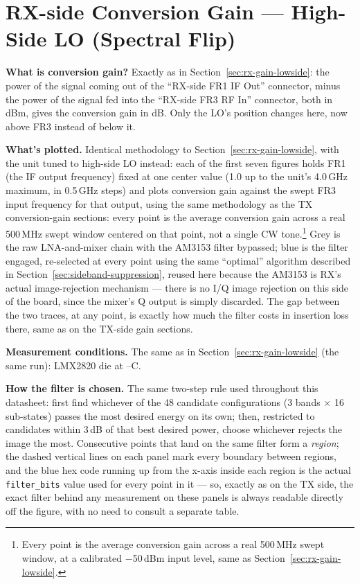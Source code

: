 \clearpage
\section{RX-side Conversion Gain --- High-Side LO (Spectral Flip)}
\label{sec:rx-gain-highside}

\textbf{What is conversion gain?} Exactly as in Section~\ref{sec:rx-gain-lowside}: the power of the signal
coming out of the ``RX-side FR1 IF Out'' connector, minus the power of the signal fed into the ``RX-side FR3 RF In'' connector, both in dBm,
gives the conversion gain in dB. Only the LO's position changes here, now above FR3 instead of below it.

\textbf{What's plotted.} Identical methodology to Section~\ref{sec:rx-gain-lowside}, with the unit tuned to
high-side LO instead: each of the first seven figures holds FR1 (the IF output frequency) fixed at one center
value (1.0 up to the unit's 4.0\,GHz maximum, in 0.5\,GHz steps) and plots conversion gain against the swept
FR3 input frequency for that output, using the same methodology as the TX conversion-gain sections: every point
is the average conversion gain across a real 500\,MHz swept window centered on that point, not a single CW
tone.\footnote{Every point is the average conversion gain across a real 500\,MHz swept window, at a calibrated
−50\,dBm input level, same as Section~\ref{sec:rx-gain-lowside}.} Grey is the raw LNA-and-mixer chain with
the AM3153 filter bypassed; blue is the filter engaged, re-selected at every point using the same ``optimal''
algorithm described in Section~\ref{sec:sideband-suppression}, reused here because the AM3153 is RX's actual
image-rejection mechanism --- there is no I/Q image rejection on this side of the board, since the mixer's Q
output is simply discarded. The gap between the two traces, at any point, is exactly how much the filter costs
in insertion loss there, same as on the TX-side gain sections.

\textbf{Measurement conditions.} The same as in Section~\ref{sec:rx-gain-lowside} (the same run): LMX2820 die at \condRxGainMinC--\condRxGainMaxC\textdegree C.

\textbf{How the filter is chosen.} The same two-step rule used throughout this datasheet: first find whichever
of the 48 candidate configurations (3 bands × 16 sub-states) passes the most desired energy on its own;
then, restricted to candidates within 3\,dB of that best desired power, choose whichever rejects the image the
most. Consecutive points that land on the same filter form a \emph{region}; the dashed vertical lines on each
panel mark every boundary between regions, and the blue hex code running up from the x-axis inside each region
is the actual \texttt{filter\_bits} value used for every point in it --- so, exactly as on the TX side, the
exact filter behind any measurement on these panels is always readable directly off the figure, with no need to
consult a separate table.

